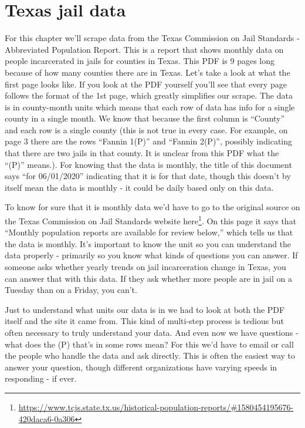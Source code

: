 \documentclass[
]{krantz}
\renewcommand{\href}[2]{#2\footnote{\url{#1}}}
\begin{document}
\hypertarget{texas-jail-data}{%
\section{Texas jail data}\label{texas-jail-data}}

For this chapter we'll scrape data from the Texas Commission
on Jail Standards - Abbreviated Population Report. This is a
report that shows monthly data on people incarcerated in
jails for counties in Texas. This PDF is 9 pages long
because of how many counties there are in Texas. Let's take
a look at what the first page looks like. If you look at the
PDF yourself you'll see that every page follows the format
of the 1st page, which greatly simplifies our scrape. The
data is in county-month units which means that each row of
data has info for a single county in a single month. We know
that because the first column is ``County'' and each row is
a single county (this is not true in every case. For
example, on page 3 there are the rows ``Fannin 1(P)'' and
``Fannin 2(P)'', possibly indicating that there are two
jails in that county. It is unclear from this PDF what the
``(P)'' means.). For knowing that the data is monthly, the
title of this document says ``for 06/01/2020'' indicating
that it is for that date, though this doesn't by itself mean
the data is monthly - it could be daily based only on this
data.

To know for sure that it is monthly data we'd have to go to
the original source on the Texas Commission on Jail
Standards website
\href{https://www.tcjs.state.tx.us/historical-population-reports/\#1580454195676-420daca6-0a306}{here}.
On this page it says that ``Monthly population reports are
available for review below,'' which tells us that the data
is monthly. It's important to know the unit so you can
understand the data properly - primarily so you know what
kinds of questions you can answer. If someone asks whether
yearly trends on jail incarceration change in Texas, you can
answer that with this data. If they ask whether more people
are in jail on a Tuesday than on a Friday, you can't.

Just to understand what units our data is in we had to look
at both the PDF itself and the site it came from. This kind
of multi-step process is tedious but often necessary to
truly understand your data. And even now we have questions -
what does the (P) that's in some rows mean? For this we'd
have to email or call the people who handle the data and ask
directly. This is often the easiest way to answer your
question, though different organizations have varying speeds
in responding - if ever.
\end{document}
